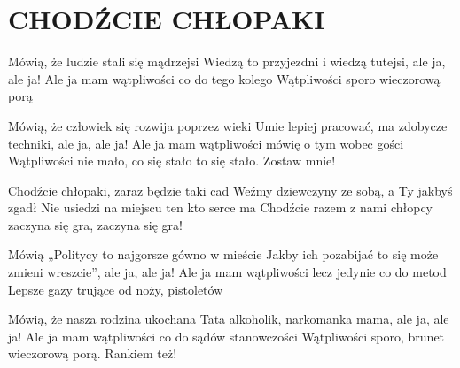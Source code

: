 \documentclass[../../../songbook.tex]{subfiles}
\begin{document}
\TabPositions{9cm} %
\section*{CHODŹCIE CHŁOPAKI}
{}
\vspace{0.5cm}
Mówią, że ludzie stali się mądrzejsi  \newline	 
Wiedzą to przyjezdni i wiedzą tutejsi, ale ja, ale ja!  \newline	 
Ale ja mam wątpliwości co do tego kolego  \newline	 
Wątpliwości sporo wieczorową porą  \newline	 

Mówią, że człowiek się rozwija poprzez wieki \newline
Umie lepiej pracować, ma zdobycze techniki, ale ja, ale ja! \newline
Ale ja mam wątpliwości mówię o tym wobec gości \newline
Wątpliwości nie mało, co się stało to się stało. Zostaw mnie! \newline

\-\hspace{1cm} Chodźcie chłopaki, zaraz będzie taki cad \newline
\-\hspace{1cm} Weźmy dziewczyny ze sobą, a Ty jakbyś zgadł \newline
\-\hspace{1cm} Nie usiedzi na miejscu ten kto serce ma \newline
\-\hspace{1cm} Chodźcie razem z nami chłopcy zaczyna się gra, zaczyna się gra! \newline

Mówią „Politycy to najgorsze gówno w mieście \newline
Jakby ich pozabijać to się może zmieni wreszcie”, ale ja, ale ja! \newline
Ale ja mam wątpliwości lecz jedynie co do metod \newline
Lepsze gazy trujące od noży, pistoletów \newline

Mówią, że nasza rodzina ukochana \newline
Tata alkoholik, narkomanka mama, ale ja, ale ja! \newline
Ale ja mam wątpliwości co do sądów stanowczości \newline
Wątpliwości sporo, brunet wieczorową porą. Rankiem też! \newline
\end{document}
